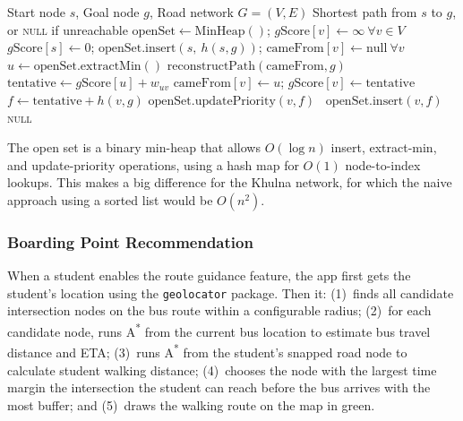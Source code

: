 \documentclass[12pt,a4paper]{report}
\begin{document}
\begin{algorithm}[t]
\caption{A\textsuperscript{*} Pathfinding on Khulna Road Network}
\label{alg:astar}
\begin{algorithmic}[1]
\Require Start node $s$, Goal node $g$, Road network $G = (V, E)$
\Ensure Shortest path from $s$ to $g$, or \textsc{null} if unreachable
\State $\text{openSet} \leftarrow \text{MinHeap}()$; $g\text{Score}[v] \leftarrow \infty \ \forall v \in V$
\State $g\text{Score}[s] \leftarrow 0$; $\text{openSet.insert}(s,\ h(s,g))$; $\text{cameFrom}[v] \leftarrow \text{null} \ \forall v$
  \State $u \leftarrow \text{openSet.extractMin}()$
   \Return $\text{reconstructPath}(\text{cameFrom}, g)$ \EndIf
    \State $\text{tentative} \leftarrow g\text{Score}[u] + w_{uv}$
      \State $\text{cameFrom}[v] \leftarrow u$; $g\text{Score}[v] \leftarrow \text{tentative}$
      \State $f \leftarrow \text{tentative} + h(v, g)$
       $\text{openSet.updatePriority}(v, f)$
      \Else\ $\text{openSet.insert}(v, f)$
      \EndIf
    \EndIf
  \EndFor
\EndWhile
\State \Return \textsc{null}
\end{algorithmic}
\end{algorithm}

The open set is a binary min-heap that allows $O(\log n)$ insert, extract-min, and update-priority operations, using a hash map for $O(1)$ node-to-index lookups. This makes a big difference for the Khulna network, for which the naive approach using a sorted list would be $O(n^2)$.

\subsubsection{Boarding Point Recommendation}

When a student enables the route guidance feature, the app first gets the student's location using the \texttt{geolocator} package. Then it: (1)~finds all candidate intersection nodes on the bus route within a configurable radius; (2)~for each candidate node, runs A\textsuperscript{*} from the current bus location to estimate bus travel distance and ETA; (3)~runs A\textsuperscript{*} from the student's snapped road node to calculate student walking distance; (4)~chooses the node with the largest time margin the intersection the student can reach before the bus arrives with the most buffer; and (5)~draws the walking route on the map in green.
\end{document}
